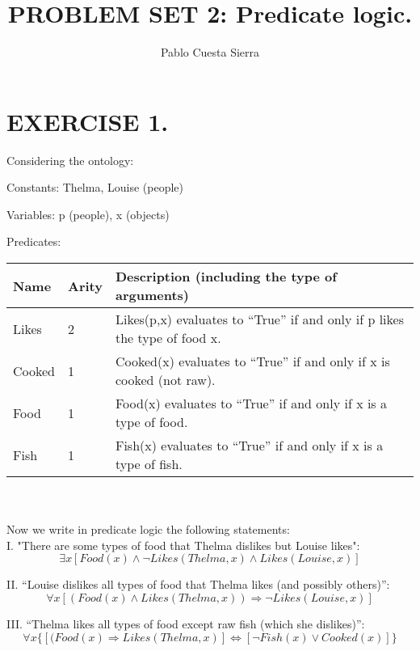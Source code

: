 \documentclass{article}
\title{PROBLEM SET 2: Predicate logic.}
\author{Pablo Cuesta Sierra}
\begin{document}
\maketitle

\section*{EXERCISE 1.}

	Considering the ontology:

	Constants: Thelma, Louise (people)
    
	Variables: p (people), x (objects)
    
	Predicates: \\
\begin{tabular}{|l|l|l|}
\hline
Name   & Arity & Description (including the type of arguments)   \\ \hline
Likes  & 2     &  Likes(p,x) evaluates to “True” if and only if p
likes the type of food x. \\ \hline
Cooked & 1     & Cooked(x) evaluates to “True” if and only if x
is cooked (not raw).  \\ \hline
Food   & 1     & Food(x) evaluates to “True” if and only if x is
a type of food.\\ \hline
Fish   & 1     & Fish(x) evaluates to “True” if and only if x is
a type of fish. \\ \hline
\end{tabular}\\
\\[\baselineskip]
Now we write in predicate logic the following statements:\\

I. "There are some types of food that Thelma dislikes but Louise likes":
$$\exists x [Food(x)\land \neg Likes(Thelma,x) \land Likes(Louise,x)]$$

II. “Louise dislikes all types of food that Thelma likes (and possibly
others)”:
$$\forall x[(Food(x)\land Likes(Thelma,x))\Longrightarrow \neg Likes(Louise,x)]$$

III. “Thelma likes all types of food except raw fish (which she dislikes)”:
$$\forall x\{[(Food (x) \Longrightarrow Likes(Thelma,x)] \iff [\neg Fish(x)\lor Cooked(x)]\}$$\\[\baselineskip]
\end{document}
